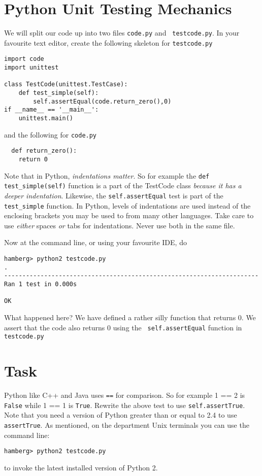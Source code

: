 \documentclass{paper}
\begin{document}
\section*{Python Unit Testing Mechanics}
We will split our code up into two files {\tt code.py} and {\tt
  testcode.py}. In your favourite text editor, create
the following skeleton for {\tt testcode.py}

\begin{lstlisting}
import code
import unittest

class TestCode(unittest.TestCase):
    def test_simple(self):
        self.assertEqual(code.return_zero(),0)
if __name__ == '__main__':
    unittest.main()
\end{lstlisting}

and the following for {\tt code.py}

\begin{lstlisting}
  def return_zero():
    return 0
\end{lstlisting}
Note that in Python, \emph{indentations matter}. So for example the {\tt def test\_simple(self)} function is a part of the TestCode class \emph{because it has a deeper indentation}. Likewise, the {\tt self.assertEqual} test is part of the {\tt test\_simple} function. In Python, levels of indentations are used instead of the enclosing brackets you may be used to from many other languages. Take care to use \emph{either} spaces \emph{or} tabs for indentations. Never use both in the same file.

Now at the command line, or using your favourite IDE, do
\begin{verbatim}
hamberg> python2 testcode.py
.
----------------------------------------------------------------------
Ran 1 test in 0.000s

OK

\end{verbatim}
What happened here? We have defined a rather silly function that
returns 0. We assert that the code also returns 0 using the {\tt
  self.assertEqual} function in {\tt testcode.py} 
\section{Task}
Python like C++ and Java uses {\tt ==} for comparison. So for example {1 == 2}
is {\tt False} while {1 == 1} is {\tt True}. Rewrite the above test to use
{\tt self.assertTrue}. Note that you need a version of Python greater than or
equal to 2.4 to use {\tt assertTrue}. As mentioned, on the department Unix
terminals you can use the command line:
\begin{verbatim}
hamberg> python2 testcode.py
\end{verbatim}
to invoke the latest installed version of Python 2.
\end{document}
